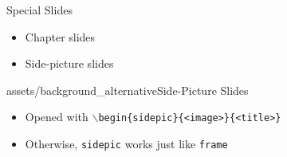 \begin{chapter}{}{Special Slides}

\begin{itemize}
    \item Chapter slides
    \item Side-picture slides
\end{itemize}
\end{chapter}


\begin{sidepic}{assets/background_alternative}{Side-Picture Slides}
\begin{itemize}
    \item Opened with \texttt{$\backslash$begin\{sidepic\}\{<image>\}\{<title>\}}
    \item Otherwise, \texttt{sidepic} works just like \texttt{frame}
\end{itemize}
\end{sidepic}
